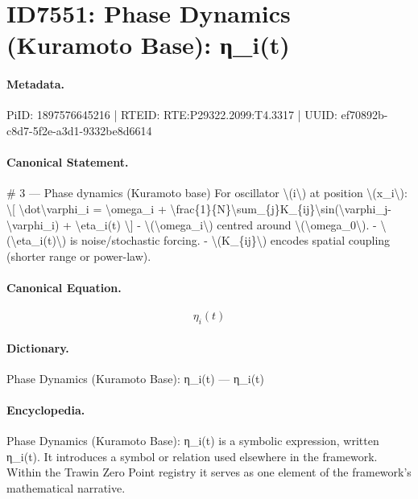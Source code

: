 \section*{ID7551: Phase Dynamics (Kuramoto Base): η\_i(t)}
\paragraph{Metadata.}
PiID: 1897576645216 | RTEID: RTE:P29322.2099:T4.3317 | UUID: ef70892b-c8d7-5f2e-a3d1-9332be8d6614

\paragraph{Canonical Statement.}
\# 3 — Phase dynamics (Kuramoto base) For oscillator \textbackslash{}(i\textbackslash{}) at position \textbackslash{}(x\_i\textbackslash{}): \textbackslash{}[ \textbackslash{}dot\textbackslash{}varphi\_i = \textbackslash{}omega\_i + \textbackslash{}frac\{1\}\{N\}\textbackslash{}sum\_\{j\}K\_\{ij\}\textbackslash{}sin(\textbackslash{}varphi\_j-\textbackslash{}varphi\_i) + \textbackslash{}eta\_i(t) \textbackslash{}] - \textbackslash{}(\textbackslash{}omega\_i\textbackslash{}) centred around \textbackslash{}(\textbackslash{}omega\_0\textbackslash{}). - \textbackslash{}(\textbackslash{}eta\_i(t)\textbackslash{}) is noise/stochastic forcing. - \textbackslash{}(K\_\{ij\}\textbackslash{}) encodes spatial coupling (shorter range or power-law).

\paragraph{Canonical Equation.}
\[
\eta_i(t)
\]

\paragraph{Dictionary.}
Phase Dynamics (Kuramoto Base): η\_i(t) — η\_i(t)

\paragraph{Encyclopedia.}
Phase Dynamics (Kuramoto Base): η\_i(t) is a symbolic expression, written η\_i(t). It introduces a symbol or relation used elsewhere in the framework. Within the Trawin Zero Point registry it serves as one element of the framework's mathematical narrative.
